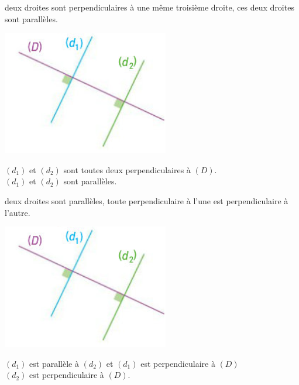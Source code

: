 \documentclass[xcolor={dvipsnames}]{beamer}
\begin{document}
\begin{frame}
	\begin{myprop}
		 deux droites sont perpendiculaires à \pause une même troisième droite,  \pause ces deux droites sont parallèles.\pause
	\end{myprop}

	\begin{myex}
		\begin{center}
			\includegraphics[scale=0.6]{para2}
		\end{center}
	
	 $(d_1)$ et $(d_2)$ \pause sont toutes deux perpendiculaires à $(D)$.\\ 
	 \pause $(d_1)$ et $(d_2)$ sont parallèles.
	\end{myex}
\end{frame}

\begin{frame}
	\begin{myprop}
		 deux droites sont parallèles,  \pause toute perpendiculaire à l’une \pause est perpendiculaire à l’autre. \pause 
	\end{myprop}
	
	
	\begin{myex}
		\begin{center}
			\includegraphics[scale=0.56]{para2}
		\end{center}
		
		 $(d_1)$ est parallèle à $(d_2)$ et \pause $(d_1)$ est perpendiculaire à  $(D)$\\ 
		 \pause $(d_2)$ est perpendiculaire à $(D)$.
		
		
		
	\end{myex}
\end{frame}
\end{document}
